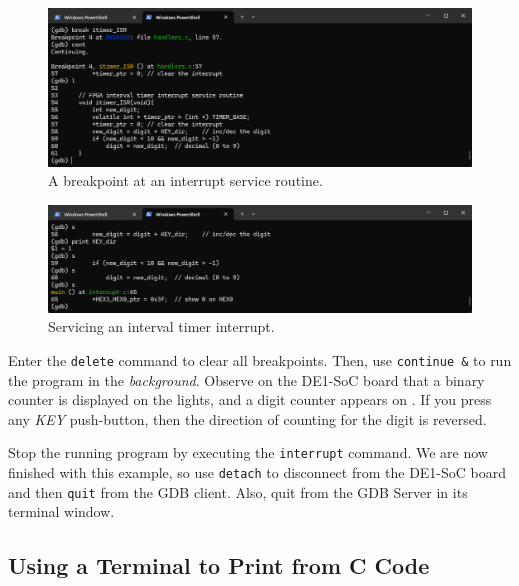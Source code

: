 \documentclass[11pt, twoside, pdftex]{article}
\newcommand{\red}[1]{{\color{red}\sf{#1}}}
\begin{document}
\begin{figure}[h]
    \begin{center}
        \includegraphics[scale=.6]{figures/interrupt_C6.png}
        \caption{A breakpoint at an interrupt service routine.}
        \label{fig:interrupt_C6}
    \end{center}
\end{figure}

\begin{figure}[h]
    \begin{center}
        \includegraphics[scale=.6]{figures/interrupt_C7.png}
        \caption{Servicing an interval timer interrupt.}
        \label{fig:interrupt_C7}
    \end{center}
\end{figure}

Enter the \texttt{delete} command to clear all breakpoints. Then, use \texttt{continue \&}
to run the program in the {\it background}. Observe on the DE1-SoC board that a binary
counter is displayed on the \red{{\it LEDR}} lights, and a digit counter appears on 
\red{{\it HEX0}}. If you press any {\it KEY} push-button, then the direction of counting
for the digit is reversed.

Stop the running program by executing the \texttt{interrupt} command. 
We are now finished with this example, so use \texttt{detach} to disconnect from the DE1-SoC 
board and then \texttt{quit} from the GDB client. Also, quit from the GDB Server in its 
terminal window. 

\subsection{Using a Terminal to Print from C Code}
\end{document}
